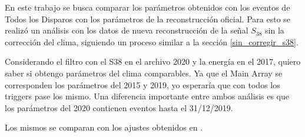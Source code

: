 En este trabajo se busca comparar los parámetros obtenidos con los eventos de Todos los Disparos con los parámetros de la reconstrucción oficial. Para esto se realizó un análisis con los datos de nueva reconstrucción de la señal $S_{38}$ sin la corrección del clima, siguiendo un proceso similar a la sección \ref{sin_corregir_s38}.






      Considerando el filtro con el S38 en el archivo 2020 y la energía en el 2017, quiero saber si obtengo parámetros  del clima comparables. Ya que el Main Array se corresponden los parámetros del 2015 y 2019, yo esperaría que con todos los triggers pase los mismo. Una diferencia importante entre ambos análisis es que los parámetros del 2020 contienen eventos hasta el 31/12/2019.
      
      Los mismos se comparan con los ajustes obtenidos en \cite{aab2017impact}.

